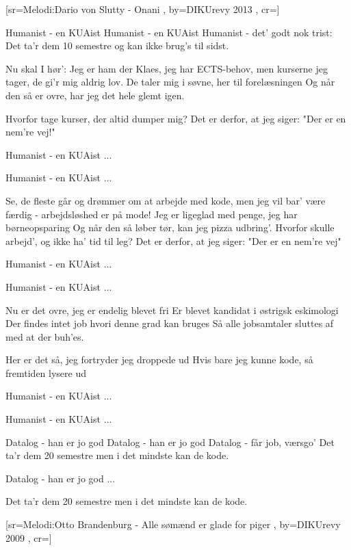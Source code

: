 \documentclass[pdftex,12pt]{article}
\begin{document}
\begin{songs}{}
[sr={Melodi:Dario von Slutty - Onani}
,
by={DIKUrevy 2013}
,
cr={}]\hypertarget{Humanist}{}
\label{song50}

\beginverse
Humanist - en KUAist
Humanist - en KUAist
Humanist - det' godt nok trist:
Det ta'r dem 10 semestre
og kan ikke brug's til sidst.

\endverse
\beginverse
Nu skal I hør':
Jeg er ham der Klaes, jeg har ECTS-behov,
men kurserne jeg tager, de gi'r mig aldrig lov.
De taler mig i søvne, her til forelæsningen
Og når den så er ovre, har jeg det hele glemt igen.

\endverse
\beginverse
Hvorfor tage kurser, der altid dumper mig?
Det er derfor, at jeg siger: "Der er en nem're vej!"

\endverse
\beginverse
Humanist - en KUAist ...

\endverse
\beginverse
Humanist - en KUAist ...

\endverse
\beginverse
Se, de fleste går og drømmer om at arbejde med kode,
men jeg vil bar' være færdig - arbejdsløshed er på mode!
Jeg er ligeglad med penge, jeg har børneopsparing
Og når den så løber tør, kan jeg pizza udbring'.
Hvorfor skulle arbejd', og ikke ha' tid til leg?
Det er derfor, at jeg siger: "Der er en nem're vej"

\endverse
\beginverse
Humanist - en KUAist ...

\endverse
\beginverse
Humanist - en KUAist ...

\endverse
\beginverse
Nu er det ovre, jeg er endelig blevet fri
Er blevet kandidat i østrigsk eskimologi
Der findes intet job hvori denne grad kan bruges
Så alle jobsamtaler sluttes af med at der buh'es.

\endverse
\beginverse
Her er det så, jeg fortryder jeg droppede ud
Hvis bare jeg kunne kode, så fremtiden lysere ud

\endverse
\beginverse
Humanist - en KUAist ...

\endverse
\beginverse
Humanist - en KUAist ...

\endverse
\beginverse
Datalog - han er jo god
Datalog - han er jo god
Datalog - får job, værsgo'
Det ta'r dem 20 semestre
men i det mindste kan de kode.

\endverse
\beginverse
Datalog - han er jo god ...

\endverse
\beginverse
Det ta'r dem 20 semestre
men i det mindste kan de kode.

\endverse
\endsong



[sr={Melodi:Otto Brandenburg - Alle sømænd er glade for piger}
,
by={DIKUrevy 2009}
,
cr={}]\hypertarget{Doktrinen}{}
\label{song51}


\end{songs}
\end{document}
